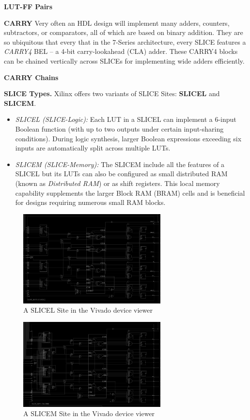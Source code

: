 \documentclass[twocolumn]{article}
\begin{document}
    \textbf{LUT-FF Pairs} \quad

    \textbf{CARRY} \quad
        Very often an HDL design will implement many adders, counters, subtractors, or comparators, all of which are based on binary addition. 
        They are so ubiquitous that every that in the 7-Series architecture, every SLICE features a \emph{CARRY4} BEL -- a 4-bit carry-lookahead (CLA) adder. 
        These CARRY4 blocks can be chained vertically across SLICEs for implementing wide adders efficiently. 

    \textbf{CARRY Chains} \quad



    \textbf{SLICE Types.}\quad 
    Xilinx offers two variants of SLICE Sites: \textbf{SLICEL} and \textbf{SLICEM}.  
    \begin{itemize}
        \item \emph{SLICEL (SLICE-Logic):} Each LUT in a SLICEL can implement a 6-input Boolean function (with up to two outputs under certain input-sharing conditions). During logic synthesis, larger Boolean expressions exceeding six inputs are automatically split across multiple LUTs.
        \item \emph{SLICEM (SLICE-Memory):} The SLICEM include all the features of a SLICEL but its LUTs can also be configured as small distributed RAM (known as \emph{Distributed RAM}) or as shift registers. This local memory capability supplements the larger Block RAM (BRAM) cells and is beneficial for designs requiring numerous small RAM blocks.
    \end{itemize}

    \begin{figure}[h]
        \centering
        \includegraphics[width=7.5cm]{figures/slicel.png}
        \caption{A SLICEL Site in the Vivado device viewer}
        \label{fig:slicel}
    \end{figure}

    \begin{figure}[h]
        \centering
        \includegraphics[width=7.5cm]{figures/slicem.png}
        \caption{A SLICEM Site in the Vivado device viewer}
        \label{fig:slicem}
    \end{figure}
\end{document}
